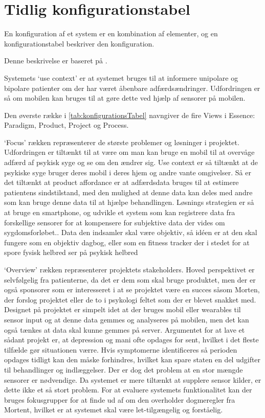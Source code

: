 \section{Tidlig konfigurationstabel}
En konfiguration af et system er en kombination af elementer, og en konfigurationstabel beskriver den konfiguration.

Denne beskrivelse er baseret på  \citet[Afsnit 3.2, Side 16-21]{art:essence}.

Systemets `use context' er at systemet bruges til at informere unipolare og bipolare patienter om der har været åbenbare adfærdsændringer. Udfordringen er så om mobilen kan bruges til at gøre dette ved hjælp af sensorer på mobilen.

Den øverste række i \cref{tab:konfigurationsTabel} navngiver de fire Views i Essence: Paradigm, Product, Project og Process.

`Focus' rækken repræsenterer de største problemer og løsninger i projektet. 
Udfordringen er tiltænkt til at være om man kan bruge en mobil til at overvåge adfærd af psykisk syge og se om den ændrer sig. 
Use context er så tiltænkt at de psykiske syge bruger deres mobil i deres hjem og andre vante omgivelser. 
Så er det tiltænkt at product affordance er at adfærdsdata bruges til at estimere patientens sindstilstand, med den mulighed at denne data kan deles med andre som kan bruge denne data til at hjælpe behandlingen. 
Løsnings strategien er så at bruge en smartphone, og udvikle et system som kan registrere data fra forskellige sensorer for at kompensere for subjektive data der vides om sygdomsforløbet..
Data den indsamler skal være objektiv, så idéen er at den skal fungere som en objektiv dagbog, eller som en fitness tracker der i stedet for at spore fysisk helbred ser på psykisk helbred 

`Overview' rækken repræsenterer projektets stakeholders. 
Hoved perspektivet er selvfølgelig fra patienterne, da det er dem som skal bruge produktet, men der er også sponsorer som er interesseret i at se projektet være en succes såsom Morten, der forslog projektet eller de to i psykologi feltet som der er blevet snakket med. 
Designet på projektet er simpelt idet at der bruges mobil eller wearables til sensor input og at denne data gemmes og analyseres på mobilen, men det kan også tænkes at data skal kunne gemmes på server. 
Argumentet for at lave et sådant projekt er, at depression og mani ofte opdages for sent, hvilket i det fleste tilfælde gør situationen værre.
Hvis symptomerne identificeres så perioden opdages tidligt kan den måske forhindres, hvilket kan spare staten en del udgifter til behandlinger og indlæggelser.
Der er dog det problem at en stor mængde sensorer er nødvendige.
Da systemet er mere tiltænkt at supplere sensor kilder, er dette ikke et så stort problem.
For at evaluere systemets funktionalitet kan der bruges fokusgrupper for at finde ud af om den overholder dogmeregler fra Mortent, hvilket er at systemet skal være let-tilgængelig og forståelig.

